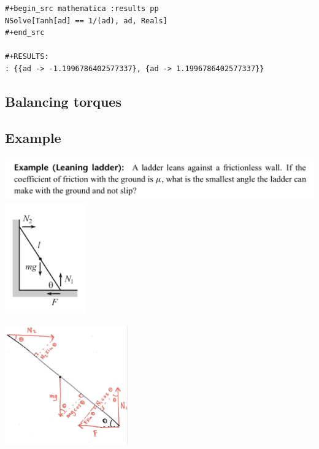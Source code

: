 \begin{verbatim}
#+begin_src mathematica :results pp
NSolve[Tanh[ad] == 1/(ad), ad, Reals]
#+end_src

#+RESULTS:
: {{ad -> -1.1996786402577337}, {ad -> 1.1996786402577337}}
\end{verbatim}



\newpage

\subsection*{Balancing torques}

\subsection*{Example}
\begin{mdframed}
  \includegraphics[width=400pt]{img/physics--classical-mechanics--morin--2--torque-example.png}\\
  \includegraphics[width=100pt]{img/physics--classical-mechanics--morin--2--torque-example-diag.png}
\end{mdframed}

\includegraphics[width=150pt]{img/physics--classical-mechanics--morin--2--torque-example-diag-2.png}

